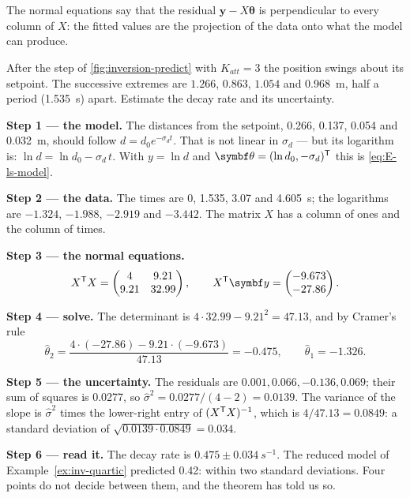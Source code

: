 The normal equations say that the residual $\symbf y - X\hat{\symbf\theta}$ is perpendicular to every column of $X$: the fitted values are the projection of the data onto what the model can produce.

\begin{example}
\label{ex:E-fit}
After the step of \cref{fig:inversion-predict} with $K_{att} = 3$ the position swings about its setpoint. The successive extremes are $1.266$, $0.863$, $1.054$ and \SI{0.968}{m}, half a period (\SI{1.535}{s}) apart. Estimate the decay rate and its uncertainty.

\textbf{Step 1 — the model.} The distances from the setpoint, 0.266, 0.137, 0.054 and \SI{0.032}{m}, should follow $d = d_0e^{-\sigma_dt}$. That is not linear in $\sigma_d$ — but its logarithm is: $\ln d = \ln d_0 - \sigma_d\,t$. With $y = \ln d$ and $\symbf\theta = (\ln d_0, -\sigma_d)^\T$ this is \cref{eq:E-ls-model}.

\textbf{Step 2 — the data.} The times are 0, 1.535, 3.07 and \SI{4.605}{s}; the logarithms are $-1.324$, $-1.988$, $-2.919$ and $-3.442$. The matrix $X$ has a column of ones and the column of times.

\textbf{Step 3 — the normal equations.}
\begin{equation*}
  X^\T X = \begin{pmatrix}4 & 9.21\\ 9.21 & 32.99\end{pmatrix}, \qquad X^\T\symbf y = \begin{pmatrix}-9.673\\ -27.86\end{pmatrix}.
\end{equation*}

\textbf{Step 4 — solve.} The determinant is $4 \cdot 32.99 - 9.21^2 = 47.13$, and by Cramer's rule
\begin{equation*}
  \hat\theta_2 = \frac{4 \cdot (-27.86) - 9.21 \cdot (-9.673)}{47.13} = -0.475, \qquad \hat\theta_1 = -1.326 .
\end{equation*}

\textbf{Step 5 — the uncertainty.} The residuals are $0.001, 0.066, -0.136, 0.069$; their sum of squares is 0.0277, so $\hat\sigma^2 = 0.0277/(4 - 2) = 0.0139$. The variance of the slope is $\hat\sigma^2$ times the lower-right entry of $(X^{\mathsf{T}} X)^{-1}$, which is $4/47.13 = 0.0849$: a standard deviation of $\sqrt{0.0139 \cdot 0.0849} = 0.034$.

\textbf{Step 6 — read it.} The decay rate is $0.475 \pm \SI{0.034}{s^{-1}}$. The reduced model of Example~\ref{ex:inv-quartic} predicted 0.42: within two standard deviations. Four points do not decide between them, and the theorem has told us so.
\end{example}

